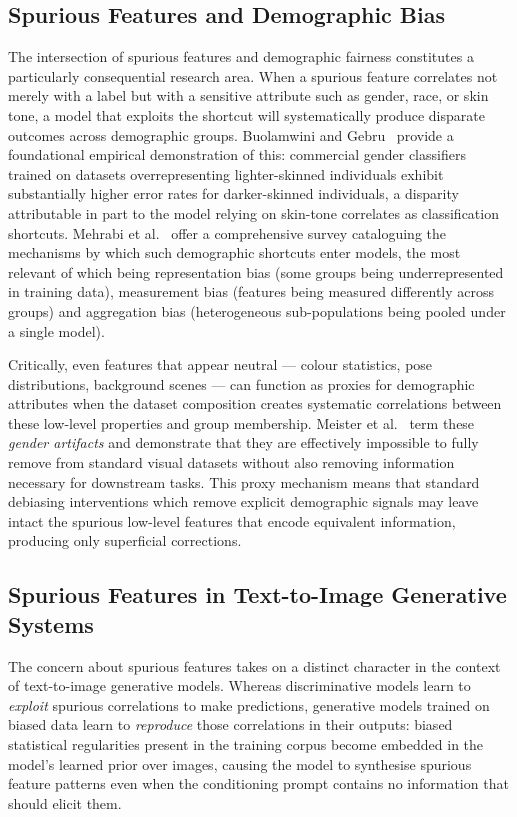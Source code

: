 \subsection*{Spurious Features and Demographic Bias}

The intersection of spurious features and demographic fairness constitutes a particularly
consequential research area.  When a spurious feature correlates not merely with a label but
with a sensitive attribute such as gender, race, or skin tone, a model that exploits the
shortcut will systematically produce disparate outcomes across demographic groups.  Buolamwini
and Gebru~\cite{Buolamwini_2018_BiasGenderClassification} provide a foundational empirical
demonstration of this: commercial gender classifiers trained on datasets overrepresenting
lighter-skinned individuals exhibit substantially higher error rates for darker-skinned
individuals, a disparity attributable in part to the model relying on skin-tone correlates
as classification shortcuts.  Mehrabi et al.~\cite{Mehrabi_2022_SurveyBiasFairnessMachine}
offer a comprehensive survey cataloguing the mechanisms by which such demographic shortcuts
enter models, the most relevant of which being representation bias (some groups being underrepresented in
training data), measurement bias (features being measured differently across groups) and
aggregation bias (heterogeneous sub-populations being pooled under a single model).

Critically, even features that appear neutral --- colour statistics, pose distributions,
background scenes --- can function as proxies for demographic attributes when the
dataset composition creates systematic correlations between these low-level properties
and group membership.  Meister et al.~\cite{Meister_2023_GenderArtifactsinVisualDatasets}
term these \emph{gender artifacts} and demonstrate that they are effectively impossible to
fully remove from standard visual datasets without also removing information necessary for
downstream tasks.  This proxy mechanism means that standard debiasing interventions which
remove explicit demographic signals may leave intact the spurious low-level features that
encode equivalent information, producing only superficial corrections.

\subsection*{Spurious Features in Text-to-Image Generative Systems}

The concern about spurious features takes on a distinct character in the context of
text-to-image generative models.  Whereas discriminative models learn to \emph{exploit}
spurious correlations to make predictions, generative models trained on biased data learn to
\emph{reproduce} those correlations in their outputs: biased statistical regularities present
in the training corpus become embedded in the model's learned prior over images, causing the
model to synthesise spurious feature patterns even when the conditioning prompt contains no
information that should elicit them.

